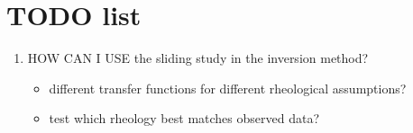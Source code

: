 \chapter{TODO list}

\begin{enumerate}

\item HOW CAN I USE the sliding study in the inversion method?
    \begin{itemize}
       \item different transfer functions for different rheological assumptions? 
       \item test which rheology best matches observed data?
    \end{itemize}

\end{enumerate}

